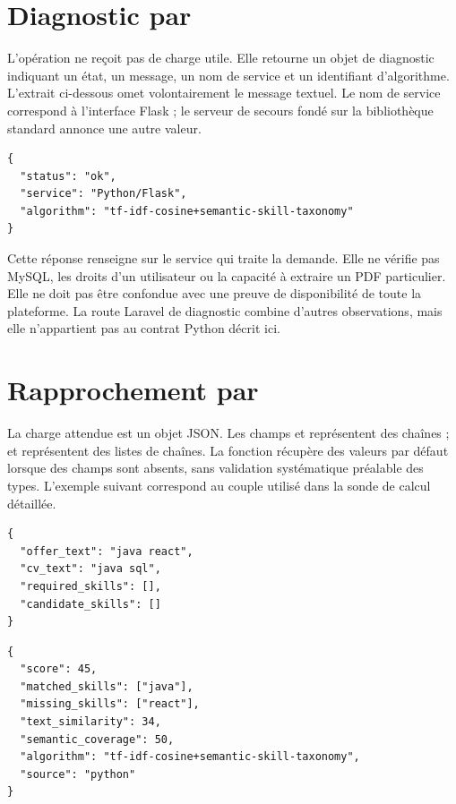 \section{Diagnostic par }

L'opération ne reçoit pas de charge utile. Elle retourne un objet de diagnostic indiquant un état, un message, un nom de service et un identifiant d'algorithme. L'extrait ci-dessous omet volontairement le message textuel. Le nom de service correspond à l'interface Flask ; le serveur de secours fondé sur la bibliothèque standard annonce une autre valeur.

\begin{lstlisting}[caption={Extrait structurel du diagnostic Flask}]
{
  "status": "ok",
  "service": "Python/Flask",
  "algorithm": "tf-idf-cosine+semantic-skill-taxonomy"
}
\end{lstlisting}

Cette réponse renseigne sur le service qui traite la demande. Elle ne vérifie pas MySQL, les droits d'un utilisateur ou la capacité à extraire un PDF particulier. Elle ne doit pas être confondue avec une preuve de disponibilité de toute la plateforme. La route Laravel de diagnostic combine d'autres observations, mais elle n'appartient pas au contrat Python décrit ici.

\section{Rapprochement par }

La charge attendue est un objet JSON. Les champs  et  représentent des chaînes ;  et  représentent des listes de chaînes. La fonction récupère des valeurs par défaut lorsque des champs sont absents, sans validation systématique préalable des types. L'exemple suivant correspond au couple utilisé dans la sonde de calcul détaillée.

\begin{lstlisting}[caption={Requête synthétique de rapprochement}]
{
  "offer_text": "java react",
  "cv_text": "java sql",
  "required_skills": [],
  "candidate_skills": []
}
\end{lstlisting}

\begin{lstlisting}[caption={Résultat Python enregistré pour ce couple}]
{
  "score": 45,
  "matched_skills": ["java"],
  "missing_skills": ["react"],
  "text_similarity": 34,
  "semantic_coverage": 50,
  "algorithm": "tf-idf-cosine+semantic-skill-taxonomy",
  "source": "python"
}
\end{lstlisting}

